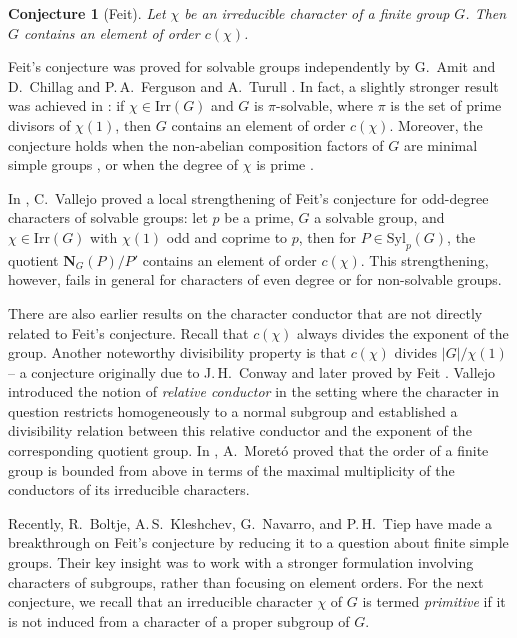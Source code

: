\documentclass[12pt]{amsart}
\newtheorem{conjecture}[theorem]{Conjecture}
\theoremstyle{definition}
\numberwithin{equation}{section}
\newcommand{\Irr}{{\mathrm {Irr}}}
\newcommand{\Syl}{{\mathrm {Syl}}}
\newcommand{\bN}{{\mathbf{N}}}
\begin{document}
\begin{conjecture}[Feit]\label{conj:Feit}
Let $\chi$ be an irreducible character of a finite group $G$. Then
$G$ contains an element of order $c(\chi)$.
\end{conjecture}

Feit's conjecture was proved for solvable groups independently by
G.~Amit and D.~Chillag \cite{Amit-Chillag86} and P.\,A.~Ferguson and
A.~Turull \cite{Ferguson-Turull86}. In fact, a slightly stronger
result was achieved in \cite{Ferguson-Turull86}: if $\chi\in\Irr(G)$
and $G$ is $\pi$-solvable, where $\pi$ is the set of prime divisors
of $\chi(1)$, then $G$ contains an element of order $c(\chi)$.
Moreover, the conjecture holds when the non-abelian composition
factors of $G$ are minimal simple groups \cite{Ferguson-Turull87},
or when the degree of $\chi$ is prime \cite{HTZ}.

In \cite{V16}, C.~Vallejo proved a local strengthening of Feit's
conjecture for odd-degree characters of solvable groups: let $p$ be
a prime, $G$ a solvable group, and $\chi\in\Irr(G)$ with $\chi(1)$
odd and coprime to $p$, then for $P \in \Syl_p(G)$, the quotient
$\bN_G(P)/P'$ contains an element of order $c(\chi)$. This
strengthening, however, fails in general for characters of even
degree or for non-solvable groups.


There are also earlier results on the character conductor that are
not directly related to Feit's conjecture. Recall that $c(\chi)$
always divides the exponent of the group. Another noteworthy
divisibility property is that $c(\chi)$ divides $|G|/\chi(1)$ -- a
conjecture originally due to J.\,H.~Conway and later proved by Feit
\cite{Feit82}. Vallejo \cite{V23} introduced the notion of
\emph{relative conductor} in the setting where the character in
question restricts homogeneously to a normal subgroup and
established a divisibility relation between this relative conductor
and the exponent of the corresponding quotient group. In
\cite{Moreto}, A.~Moret\'{o} proved that the order of a finite group
is bounded from above in terms of the maximal multiplicity of the
conductors of its irreducible characters.

Recently, R.~Boltje, A.\,S.~Kleshchev, G.~Navarro, and P.\,H.~Tiep
have made a breakthrough on Feit's conjecture by reducing it to a
question about finite simple groups. Their key insight was to work
with a stronger formulation involving characters of subgroups,
rather than focusing on element orders. For the next conjecture, we
recall that an irreducible character $\chi$ of $G$ is termed
\emph{primitive} if it is not induced from a character of a proper
subgroup of $G$.
\end{document}

